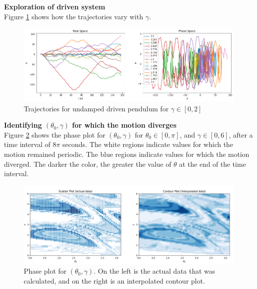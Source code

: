 \begin{problem}{4}
	\textbf{Exploration of driven system} \\
	Figure \ref{driving2} shows how the trajectories vary with $\gamma$.  

\begin{figure}[ht!]
	\centering
	\includegraphics[scale=0.5]{../figures/driving2.png}
	\caption{Trajectories for undamped driven pendulum for $\gamma \in [0,2]$}
	\label{driving2}
\end{figure}
\end{problem}

\begin{problem}{5}
	\textbf{Identifying $(\theta_{0},\gamma)$ for which the motion diverges} \\

	Figure \ref{diverge} shows the phase plot for $(\theta_{0},\gamma)$ for $\theta_{0} \in [0,\pi]$, and $\gamma \in [0,6]$, after a time interval of $8\pi$ seconds.  The white regions indicate values for which the motion remained periodic. The blue regions indicate values for which the motion diverged.  The darker the color, the greater the value of $\theta$ at the end of the time interval.
\begin{figure}[h!]
	\centering
  	\includegraphics[scale=0.5]{../figures/diverge2.png}
 	\caption{Phase plot for $(\theta_{0},\gamma)$. On the left is the actual data that was calculated, and on the right is an interpolated contour plot.}
  	\label{diverge}
\end{figure}
\end{problem}

